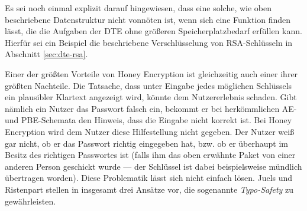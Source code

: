 Es sei noch einmal explizit darauf hingewiesen, dass eine solche, wie oben beschriebene Datenstruktur nicht vonnöten ist, wenn sich eine Funktion finden lässt, die die Aufgaben der DTE ohne größeren Speicherplatzbedarf erfüllen kann. Hierfür sei ein Beispiel die beschriebene Verschlüsselung von RSA-Schlüsseln in Abschnitt \ref{sec:dte-rsa}.


Einer der größten Vorteile von Honey Encryption ist gleichzeitig auch einer ihrer größten Nachteile. Die Tatsache, dass unter Eingabe jedes möglichen Schlüssels ein plausibler Klartext angezeigt wird, könnte dem Nutzererlebnis schaden. Gibt nämlich ein Nutzer das Passwort falsch ein, bekommt er bei herkömmlichen AE- und PBE-Schemata den Hinweis, dass die Eingabe nicht korrekt ist. Bei Honey Encryption wird dem Nutzer diese Hilfestellung nicht gegeben. Der Nutzer weiß gar nicht, ob er das Passwort richtig eingegeben hat, bzw. ob er überhaupt im Besitz des richtigen Passwortes ist (falls ihm das oben erwähnte Paket von einer anderen Person geschickt wurde --- der Schlüssel ist dabei beispielsweise mündlich übertragen worden). Diese Problematik lässt sich nicht einfach lösen. Juels und Ristenpart stellen in \cite{CRCS2014, EURO2014} insgesamt drei Ansätze vor, die sogenannte \emph{Typo-Safety} zu gewährleisten. 

